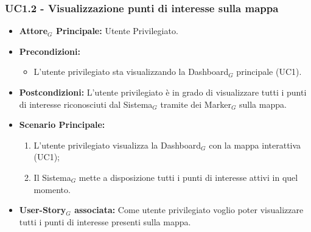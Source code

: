 \documentclass[10pt]{article}
\begin{document}
\begin{justify}
\subsubsection{\textbf{UC1.2 - Visualizzazione punti di interesse sulla mappa}}
\label{UC1.2}
\begin{itemize}
     \item \textbf{Attore$_G$ Principale:} Utente Privilegiato.
     \item \textbf{Precondizioni:}
        \begin{itemize}
    		\item L'utente privilegiato sta visualizzando la Dashboard$_G$ principale (UC1).
        \end{itemize}
     \item \textbf{Postcondizioni:} L'utente privilegiato è in grado di visualizzare tutti i punti di interesse riconosciuti dal Sistema$_G$ tramite dei Marker$_G$ sulla mappa.
     \item \textbf{Scenario Principale:}
        \begin{enumerate}
            \item L'utente privilegiato visualizza la Dashboard$_G$ con la mappa interattiva (UC1);
            \item Il Sistema$_G$ mette a disposizione tutti i punti di interesse attivi in quel momento.
        \end{enumerate}
     \item \textbf{User-Story$_G$ associata:}
     Come utente privilegiato voglio poter visualizzare tutti i punti di interesse presenti sulla mappa.
\end{itemize}

\end{justify}
\end{document}
